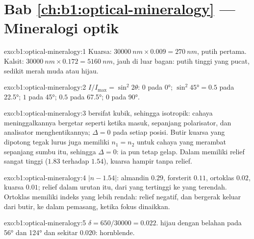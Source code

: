 \section*{Bab \ref{ch:b1:optical-mineralogy} --- Mineralogi optik}

\begin{solution}{exo:b1:optical-mineralogy:1}
Kuarsa: $\qty{30000}{nm}\times0.009 = \qty{270}{nm}$, putih  pertama.
Kalsit: $\qty{30000}{nm}\times0.172 = \qty{5160}{nm}$, jauh di luar bagan:
putih  tinggi yang pucat, sedikit merah muda atau hijau.
\end{solution}

\begin{solution}{exo:b1:optical-mineralogy:2}
$I/I_{\max} = \sin^2 2\theta$: $0$ pada \ang{0}; $\sin^2\ang{45} = 0.5$ pada
\ang{22.5}; $1$ pada \ang{45}; $0.5$ pada \ang{67.5}; $0$ pada \ang{90}.
\end{solution}

\begin{solution}{exo:b1:optical-mineralogy:3}
 bersifat kubik, sehingga isotropik: cahaya meninggalkannya bergetar seperti ketika masuk, sepanjang polarisator, dan analisator menghentikannya; $\Delta = 0$ pada setiap posisi. Butir kuarsa yang dipotong tegak lurus  juga memiliki $n_1 = n_2$ untuk cahaya yang merambat sepanjang sumbu itu, sehingga $\Delta = 0$: ia pun tetap gelap. Dalam   memiliki relief sangat tinggi ($1.83$ terhadap $1.54$), kuarsa hampir tanpa relief.
\end{solution}

\begin{solution}{exo:b1:optical-mineralogy:4}
$|n - 1.54|$: almandin $0.29$, forsterit $0.11$, ortoklas $0.02$, kuarsa $0.01$; relief dalam urutan itu, dari yang tertinggi ke yang terendah. Ortoklas memiliki indeks yang lebih rendah: relief negatif, dan  bergerak keluar dari butir, ke dalam pemasang, ketika fokus dinaikkan.
\end{solution}

\begin{solution}{exo:b1:optical-mineralogy:5}
$\delta = 650/30000 = 0.022$.  hijau  dengan belahan pada \ang{56} dan \ang{124} dan  sekitar $0.020$: hornblende.
\end{solution}

